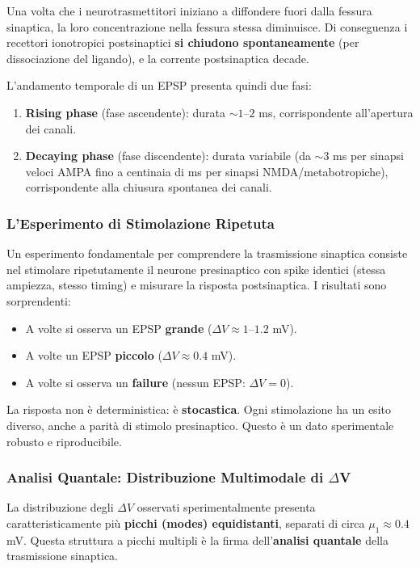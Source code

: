 Una volta che i neurotrasmettitori iniziano a diffondere fuori dalla fessura sinaptica, la loro concentrazione nella fessura stessa diminuisce. Di conseguenza i recettori ionotropici postsinaptici \textbf{si chiudono spontaneamente} (per dissociazione del ligando), e la corrente postsinaptica decade.

L'andamento temporale di un EPSP presenta quindi due fasi:
\begin{enumerate}
    \item \textbf{Rising phase} (fase ascendente): durata $\sim 1$–$2$ ms, corrispondente all'apertura dei canali.
    \item \textbf{Decaying phase} (fase discendente): durata variabile (da $\sim 3$ ms per sinapsi veloci AMPA fino a centinaia di ms per sinapsi NMDA/metabotropiche), corrispondente alla chiusura spontanea dei canali.
\end{enumerate}




\subsubsection{L'Esperimento di Stimolazione Ripetuta}

Un esperimento fondamentale per comprendere la trasmissione sinaptica consiste nel stimolare ripetutamente il neurone presinaptico con spike identici (stessa ampiezza, stesso timing) e misurare la risposta postsinaptica. I risultati sono sorprendenti:

\begin{itemize}
    \item A volte si osserva un EPSP \textbf{grande} ($\Delta V \approx 1$–$1.2$ mV).
    \item A volte un EPSP \textbf{piccolo} ($\Delta V \approx 0.4$ mV).
    \item A volte si osserva un \textbf{failure} (nessun EPSP: $\Delta V = 0$).
\end{itemize}

La risposta non è deterministica: è \textbf{stocastica}. Ogni stimolazione ha un esito diverso, anche a parità di stimolo presinaptico. Questo è un dato sperimentale robusto e riproducibile.

\subsubsection{Analisi Quantale: Distribuzione Multimodale di $\Delta$V}

La distribuzione degli $\Delta V$ osservati sperimentalmente presenta caratteristicamente più \textbf{picchi (modes) equidistanti}, separati di circa $\mu_1 \approx 0.4$ mV. Questa struttura a picchi multipli è la firma dell'\textbf{analisi quantale} della trasmissione sinaptica.

